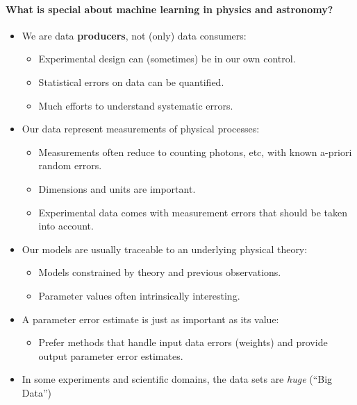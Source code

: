 \documentclass[%
oneside,                 %
final,                   %
10pt]{article}
\begin{document}
\noindent
\paragraph{What is special about machine learning in physics and astronomy?}
\begin{itemize}
  \item We are data \textbf{producers}, not (only) data consumers:
\begin{itemize}

    \item Experimental design can (sometimes) be in our own control.

    \item Statistical errors on data can be quantified.

    \item Much efforts to understand systematic errors.
\end{itemize}

\noindent
\end{itemize}

\noindent
\begin{itemize}
  \item Our data represent measurements of physical processes:
\begin{itemize}

    \item Measurements often reduce to counting photons, etc, with known a-priori random errors.

    \item Dimensions and units are important.

    \item Experimental data comes with measurement errors that should be taken into account.

\end{itemize}

\noindent
  \item Our models are usually traceable to an underlying physical theory:
\begin{itemize}

    \item Models constrained by theory and previous observations.

    \item Parameter values often intrinsically interesting.

\end{itemize}

\noindent
  \item A parameter error estimate is just as important as its value:
\begin{itemize}

    \item Prefer methods that handle input data errors (weights) and provide output parameter error estimates.

\end{itemize}

\noindent
  \item In some experiments and scientific domains, the data sets are \emph{huge} (``Big Data'')
\end{itemize}
\end{document}

